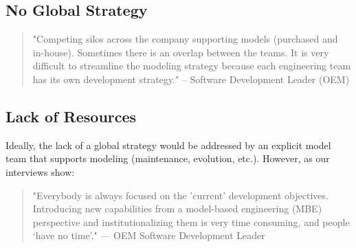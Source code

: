 


\subsection{No Global Strategy}
\begin{quote}
"Competing silos across the company supporting models (purchased and in-house).
Sometimes there is an overlap between the teams.
It is very difficult to streamline the modeling strategy because each engineering team has its own development strategy."
-- Software Development Leader (OEM)
\end{quote}


\subsection{Lack of Resources}
Ideally, the lack of a global strategy would be addressed by an explicit model team that supports modeling (maintenance, evolution, etc.). However, as our interviews show:

\begin{quote}
"Everybody is always focused on the 'current' development objectives. Introducing new capabilities from a model-based engineering (MBE) perspective and institutionalizing them is very time consuming, and people ‘have no time’." 
— OEM Software Development Leader
\end{quote}

